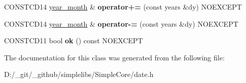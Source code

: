 \begin{DoxyCompactItemize}
\mbox{\label{classdate_1_1year__month_a418b944033d78990060d6a2ec7cd35fd}} 
C\+O\+N\+S\+T\+C\+D14 \mbox{\hyperlink{classdate_1_1year__month}{year\+\_\+month}} \& {\bfseries operator+=} (const years \&dy) N\+O\+E\+X\+C\+E\+PT
\item 
\mbox{\label{classdate_1_1year__month_afc31d8209e88397cd14c333f43f959a3}} 
C\+O\+N\+S\+T\+C\+D14 \mbox{\hyperlink{classdate_1_1year__month}{year\+\_\+month}} \& {\bfseries operator-\/=} (const years \&dy) N\+O\+E\+X\+C\+E\+PT
\item 
\mbox{\label{classdate_1_1year__month_ab43240a2a592694e7c1fc65862299b55}} 
C\+O\+N\+S\+T\+C\+D11 bool {\bfseries ok} () const N\+O\+E\+X\+C\+E\+PT
\end{DoxyCompactItemize}


The documentation for this class was generated from the following file\+:\begin{DoxyCompactItemize}
\item 
D\+:/\+\_\+git/\+\_\+github/simplelibs/\+Simple\+Core/date.\+h\end{DoxyCompactItemize}
